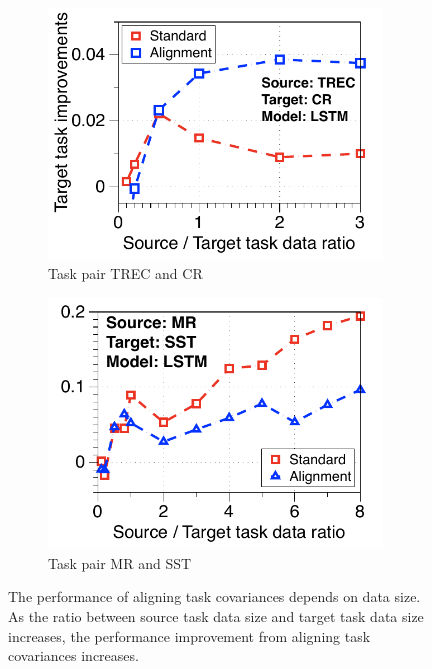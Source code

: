 \begin{figure}[!ht]
	\centering
	\begin{subfigure}[b]{0.33\textwidth}
		\centering
		\includegraphics[width=0.975\textwidth]{figures/ratio_alignment_norm_trec_cr_lstm.pdf}
		\caption{Task pair TREC and CR}
	\end{subfigure}\hfill
		\begin{subfigure}[b]{0.33\textwidth}
		\centering
		\includegraphics[width=0.975\textwidth]{figures/ratio_alignment_mr_sst_lstm.pdf}
		\caption{Task pair MR and SST}
	\end{subfigure}
	\caption{The performance of aligning task covariances depends on data size. As the ratio between source task data size and target task data size increases, the performance improvement from aligning task covariances increases.}
	\label{fig_covariate_app}
\end{figure}


